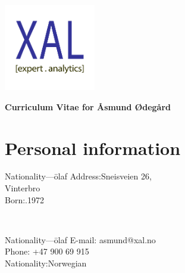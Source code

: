 \documentclass[english,a4paper,11pt]{article}
\begin{document}
\vspace*{-3cm}
\hspace*{12.5cm}\includegraphics[width=4cm]{logo.pdf}

\vspace*{-1.65cm}

\noindent
{\LARGE \bfseries \color{xaldark}Curriculum Vitae for Åsmund Ødegård}

\section*{Personal information}

\begin{minipage}[t]{0.4\textwidth}
\begin{tabbing}Nationality---\=olaf\kill 
Address:\>Sneisveien 26, \\
 Vinterbro \\
Born:.1972 \\
\end{tabbing}
\end{minipage}
$\quad\quad$
\begin{minipage}[t]{0.3\textwidth}
\begin{tabbing}Nationality---\=olaf\kill 
E-mail: \>asmund@xal.no \\
Phone: \> +47 900 69 915 \\
Nationality:\>Norwegian\\
\end{tabbing}
\end{minipage}
\end{document}
